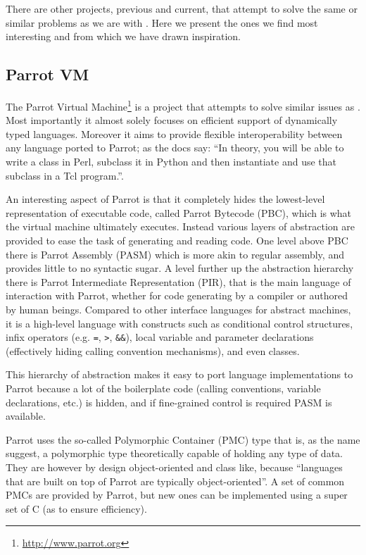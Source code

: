 There are other projects, previous and current, that attempt to solve the same
or similar problems as we are with \thename{}. Here we present the ones we find
most interesting and from which we have drawn inspiration.

\subsection{Parrot VM}
\label{sec:related-work:parrot}

The Parrot Virtual Machine\footnote{\url{http://www.parrot.org}} is a project
that attempts to solve similar issues as \thename{}. Most importantly it almost
solely focuses on efficient support of dynamically typed languages. Moreover it
aims to provide flexible interoperability between any language ported to Parrot;
as the docs say: ``In theory, you will be able to write a class in Perl,
subclass it in Python and then instantiate and use that subclass in a Tcl
program.''\cite{parrot-docs}.

An interesting aspect of Parrot is that it completely hides the lowest-level
representation of executable code, called Parrot Bytecode (PBC), which is what
the virtual machine ultimately executes. Instead various layers of abstraction
are provided to ease the task of generating and reading code. One level above
PBC there is Parrot Assembly (PASM) which is more akin to regular assembly, and
provides little to no syntactic sugar. A level further up the abstraction
hierarchy there is Parrot Intermediate Representation (PIR), that is the main
language of interaction with Parrot, whether for code generating by a compiler
or authored by human beings. Compared to other interface languages for abstract
machines, it is a high-level language with constructs such as conditional
control structures, infix operators (e.g. \texttt{=}, \texttt{>},
\texttt{\&\&}), local variable and parameter declarations (effectively hiding
calling convention mechanisms), and even classes.

This hierarchy of abstraction makes it easy to port language implementations to
Parrot because a lot of the boilerplate code (calling conventions, variable
declarations, etc.) is hidden, and if fine-grained control is required PASM is
available.

Parrot uses the so-called Polymorphic Container (PMC) type that is, as the name
suggest, a polymorphic type theoretically capable of holding any type of
data. They are however by design object-oriented and class like, because
``languages that are built on top of Parrot are typically
object-oriented''\cite{parrot-docs}. A set of common PMCs are provided by
Parrot, but new ones can be implemented using a super set of C (as to ensure
efficiency).

